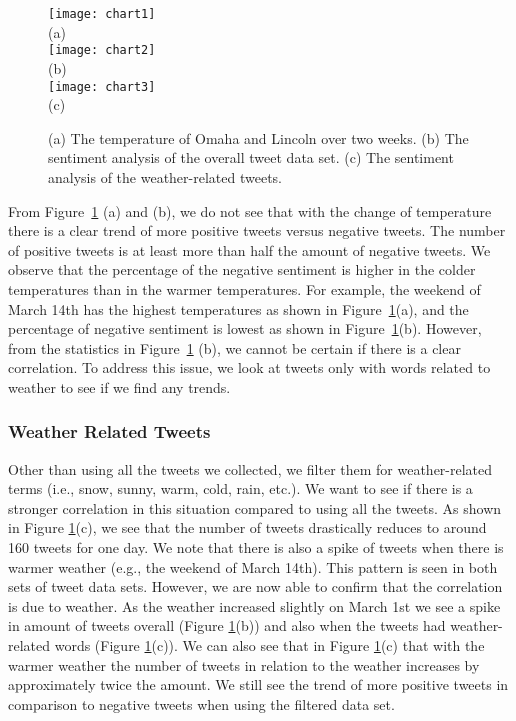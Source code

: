 \begin{figure}[t]
\begin{center}
\texttt{[image: chart1]} \\
\mbox{\small{(a)}}\\
\texttt{[image: chart2]} \\
\mbox{\small{(b)}}\\
\texttt{[image: chart3]} \\
\mbox{\small{(c)}}
\end{center}
\vspace{-.1in}
\caption{(a) The temperature of Omaha and Lincoln over two weeks. (b) The sentiment analysis of the overall tweet data set. (c) The sentiment analysis of the weather-related tweets.}
\label{fig:chart_1}
\end{figure}

From Figure~\ref{fig:chart_1} (a) and (b), we do not see that with the change of temperature there is a clear trend of more positive tweets versus negative tweets. The number of positive tweets is at least more than half the amount of negative tweets. We observe that the percentage of the negative sentiment is higher in the colder temperatures than in the warmer temperatures. For example, the weekend of March 14th has the highest temperatures as shown in Figure~\ref{fig:chart_1}(a), and the percentage of negative sentiment is lowest as shown in Figure~\ref{fig:chart_1}(b). However, from the statistics in Figure~\ref{fig:chart_1} (b), we cannot be certain if there is a clear correlation. To address this issue, we look at tweets only with words related to weather to see if we find any trends.

\subsubsection{Weather Related Tweets}

Other than using all the tweets we collected, we filter them for weather-related terms (i.e., snow, sunny, warm, cold, rain, etc.). We want to see if there is a stronger correlation in this situation compared to using all the tweets. %
As shown in Figure \ref{fig:chart_1}(c), we see that the number of tweets drastically reduces to around 160 tweets for one day.
We note that there is also a spike of tweets when there is warmer weather (e.g., the weekend of March 14th). This pattern is seen in both sets of tweet data sets. However, we are now able to confirm that the correlation is due to weather. As the weather increased slightly on March 1st we see a spike in amount of tweets overall (Figure \ref{fig:chart_1}(b)) and also when the tweets had weather-related words (Figure \ref{fig:chart_1}(c)). We can also see that in Figure \ref{fig:chart_1}(c) that with the warmer weather the number of tweets in relation to the weather increases by approximately twice the amount. We still see the trend of more positive tweets in comparison to negative tweets when using the filtered data set.

